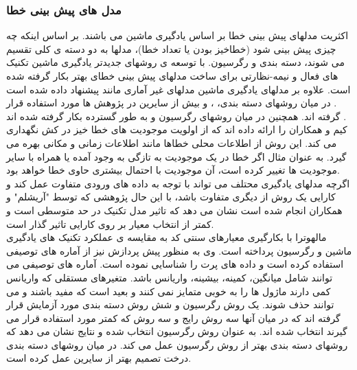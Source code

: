 
\subsubsection{مدل های پیش بینی خطا}
اکثریت مدلهای پیش بینی خطا بر اساس یادگیری ماشین می باشند. بر اساس اینکه چه چیزی پیش بینی شود (خطاخیز بودن یا تعداد خطا)، مدلها به دو دسته ی کلی تقسیم می شوند، دسته بندی و رگرسیون. با توسعه ی روشهای جدیدتر یادگیری ماشین تکنیک های فعال و نیمه-نظارتی  برای ساخت مدلهای پیش بینی خطای بهتر بکار گرفته شده است\cite{li2012sample}. علاوه بر مدلهای یادگیری ماشین مدلهای غیر آماری مانند  پیشنهاد داده شده است \cite{kim2007predicting}. در میان روشهای دسته بندی، 
 ،
 و
بیش از سایرین در پژوهش ها مورد استفاده قرار گرفته اند. همچنین در میان روشهای رگرسیون 
 و 
به طور گسترده بکار گرفته شده اند \cite{nam2014survey}. \\
کیم و همکاران  را ارائه داده اند که از اولویت موجودیت های خطا خیز در کش نگهداری می کند. این روش از اطلاعات محلی خطاها مانند اطلاعات زمانی و مکانی بهره می گیرد. به عنوان مثال اگر خطا در یک موجودیت به تازگی به وجود آمده یا همراه با سایر موجودیت ها تغییر کرده است، آن موجودیت با احتمال بیشتری حاوی خطا خواهد بود.\\
اگرچه مدلهای یادگیری محتلف می تواند  با توجه به داده های ورودی متفاوت عمل کند و کارایی یک روش از دیگری متفاوت باشد، با این حال پژوهشی که توسط "آریشلم"  و همکاران  \cite{arisholm2010systematic} انجام شده است نشان می دهد که تاثیر مدل تکنیک در حد متوسطی است و کمتر از انتخاب معیار بر روی کارایی تاثیر گذار است.  \\

مالهوترا با بکارگیری معیارهای سنتی کد به مقایسه ی عملکرد تکنیک های یادگیری ماشین و رگرسیون پرداخته است\cite{malhotra2014comparative}. وی به منظور پیش پردازش نیز از آماره های توصیفی  استفاده کرده است و داده های پرت را شناسایی نموده است. آماره های توصیفی می توانند شامل میانگین، کمینه، بیشینه، واریانس باشد. متغیرهای مستقلی که  واریانس کمی دارند ماژول ها را به خوبی متمایز نمی کنند و بعید است که مفید باشند و می توانند حذف شوند. یک روش رگرسیون و شش روش دسته بندی مورد آزمایش قرار گرفته اند که در میان آنها سه روش رایج و سه روش که کمتر مورد استفاده قرار می گیرند انتخاب شده اند.  به عنوان روش رگرسیون انتخاب شده و نتایج نشان می دهد که روشهای دسته بندی بهتر از روش رگرسیون عمل می کند. در میان روشهای دسته بندی درخت تصمیم   بهتر از سایرین عمل کرده است. 


